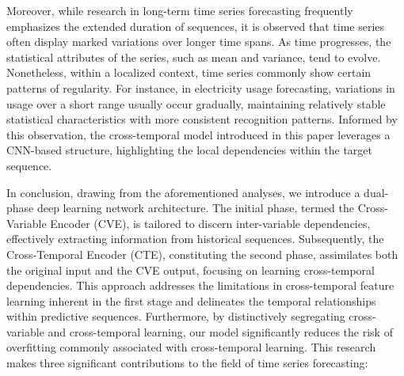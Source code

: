 Moreover, while research in long-term time series forecasting frequently emphasizes the extended duration of sequences, it is observed that time series often display marked variations over longer time spans. As time progresses, the statistical attributes of the series, such as mean and variance, tend to evolve. Nonetheless, within a localized context, time series commonly show certain patterns of regularity. For instance, in electricity usage forecasting, variations in usage over a short range usually occur gradually, maintaining relatively stable statistical characteristics with more consistent recognition patterns. Informed by this observation, the cross-temporal model introduced in this paper leverages a CNN-based structure, highlighting the local dependencies within the target sequence.

In conclusion, drawing from the aforementioned analyses, we introduce a dual-phase deep learning network architecture. The initial phase, termed the Cross-Variable Encoder (CVE), is tailored to discern inter-variable dependencies, effectively extracting information from historical sequences. Subsequently, the Cross-Temporal Encoder (CTE), constituting the second phase, assimilates both the original input and the CVE output, focusing on learning cross-temporal dependencies. This approach addresses the limitations in cross-temporal feature learning inherent in the first stage and delineates the temporal relationships within predictive sequences. Furthermore, by distinctively segregating cross-variable and cross-temporal learning, our model significantly reduces the risk of overfitting commonly associated with cross-temporal learning.
This research makes three significant contributions to the field of time series forecasting:
